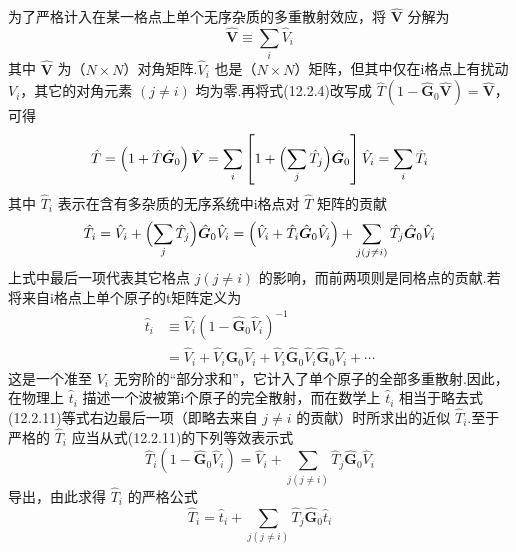 为了严格计入在某一格点上单个无序杂质的多重散射效应，将 $\hat{\boldsymbol{V}}$ 分解为
\begin{equation}
  \hat{\boldsymbol{V}}\equiv\sum_{i}\hat{V}_{i}
\end{equation}
其中 $\hat{\boldsymbol{V}}$ 为（$N\times N$）对角矩阵.$\hat{V}_{i}$ 也是（$N\times N$）矩阵，但其中仅在i格点上有扰动 $V_{i}$，其它的对角元素 $(j\neq i)$ 均为零.再将式(12.2.4)改写成 $\hat{T}\left(1-\hat{\boldsymbol{G}}_{0}\hat{\boldsymbol{V}}\right)=\hat{\boldsymbol{V}}$，可得
\begin{equation}
  \hat{T}=\left(1+\hat{T}\hat{\boldsymbol{G}}_{0}\right)\hat{\boldsymbol{V}}
  =\sum_{i}\left[1+\Bigl(\sum_{j}\hat{T}_{j}\Bigr)\hat{\boldsymbol{G}}_{0}\right]\hat{V}_{i}
  =\sum_{i}\hat{T}_{i}
\end{equation}
其中 $\hat{T}_{i}$ 表示在含有多杂质的无序系统中i格点对 $\hat{T}$ 矩阵的贡献
\begin{equation}
  \hat{T}_{i}=\hat{V}_{i}+\Bigl(\sum_{j}\hat{T}_{j}\Bigr)\hat{\boldsymbol{G}}_{0}\hat{V}_{i}
  =\left(\hat{V}_{i}+\hat{T}_{i}\hat{\boldsymbol{G}}_{0}\hat{V}_{i}\right)
  +\sum_{j(j\neq i)}\hat{T}_{j}\hat{\boldsymbol{G}}_{0}\hat{V}_{i}
\end{equation}
上式中最后一项代表其它格点 $j\left(j\neq i\right)$ 的影响，而前两项则是同格点的贡献.若将来自i格点上单个原子的t矩阵定义为
\begin{equation}
\begin{aligned}
  \hat{t}_{i}&\equiv\hat{V}_{i}\left(1-\hat{\boldsymbol{G}}_{0}\hat{V}_{i}\right)^{-1}\\
  &=\hat{V}_{i}+\hat{V}_{i}\hat{\boldsymbol{G}}_{0}\hat{V}_{i}
  +\hat{V}_{i}\hat{\boldsymbol{G}}_{0}\hat{V}_{i}\hat{\boldsymbol{G}}_{0}\hat{V}_{i}+\cdots
\end{aligned}
\end{equation}
这是一个准至 $V_{i}$ 无穷阶的“部分求和”，它计入了单个原子的全部多重散射.因此，在物理上 $\hat{t}_{i}$ 描述一个波被第i个原子的完全散射，而在数学上 $\hat{t}_{i}$ 相当于略去式(12.2.11)等式右边最后一项（即略去来自 $j\neq i$ 的贡献）时所求出的近似 $\hat{T}_{i}$.至于严格的 $\hat{T}_{i}$ 应当从式(12.2.11)的下列等效表示式
\begin{equation}
  \hat{T}_{i}\left(1-\hat{\boldsymbol{G}}_{0}\hat{V}_{i}\right)
  =\hat{V}_{i}+\sum_{j(j\neq i)}\hat{T}_{j}\hat{\boldsymbol{G}}_{0}\hat{V}_{i}
\end{equation}
导出，由此求得 $\hat{T}_{i}$ 的严格公式
\begin{equation}
  \hat{T}_{i}=\hat{t}_{i}+\sum_{j(j\neq i)}\hat{T}_{j}\hat{\boldsymbol{G}}_{0}\hat{t}_{i}
\end{equation}
